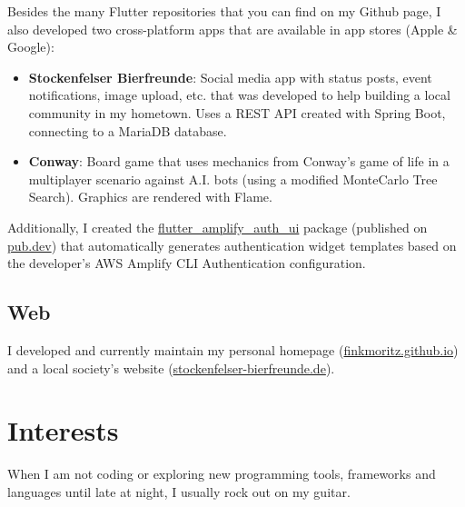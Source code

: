 \documentclass[letterpaper]{twentysecondcv} %
\begin{document}
Besides the many Flutter repositories that you can find on my Github page, I also developed two cross-platform apps that are available in app stores (Apple \& Google):
\begin{itemize}
\item \textbf{Stockenfelser Bierfreunde}: Social media app with status posts, event notifications, image upload, etc. that was developed to help building a local community in my hometown. Uses a REST API created with Spring Boot, connecting to a MariaDB database.
\item \textbf{Conway}: Board game that uses mechanics from Conway's game of life in a multiplayer scenario against A.I. bots (using a modified MonteCarlo Tree Search). Graphics are rendered with Flame.
\end{itemize}
Additionally, I created the \href{https://pub.dev/packages/flutter_amplify_auth_ui}{flutter\_amplify\_auth\_ui} package (published on  \href{https://pub.dev/packages/flutter_amplify_auth_ui}{pub.dev}) that automatically generates authentication widget templates based on the developer's AWS Amplify CLI Authentication configuration.

\subsection{Web}

I developed and currently maintain my personal homepage (\href{https://finkmoritz.github.io}{finkmoritz.github.io}) and a local society's website (\href{https://www.stockenfelser-bierfreunde.de}{stockenfelser-bierfreunde.de}).
\\



\section{{\normalsize{}} Interests}

When I am not coding or exploring new programming tools, frameworks and languages until late at night, I usually rock out on my guitar.


\end{document}
